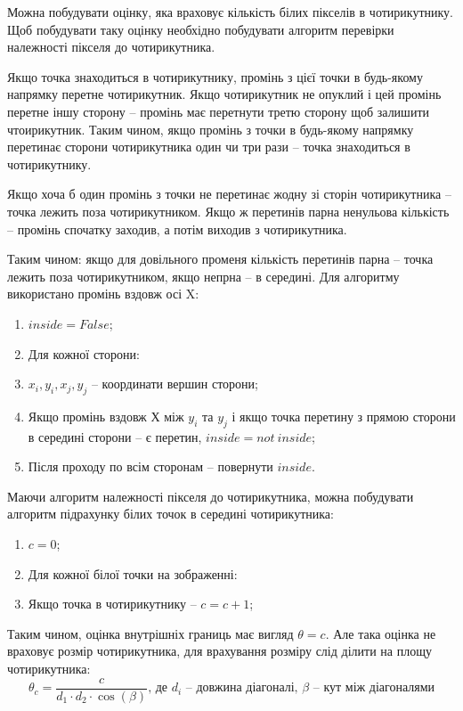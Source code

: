 \documentclass[a4paper,14pt]{report}
\begin{document}
Можна побудувати оцінку, яка враховує кількість білих пікселів в чотирикутнику. Щоб побудувати таку оцінку необхідно побудувати алгоритм перевірки належності пікселя до чотирикутника.

Якщо точка знаходиться в чотирикутнику, промінь з цієї точки в будь-якому напрямку перетне чотирикутник. Якщо чотирикутник не опуклий і цей промінь перетне іншу сторону -- промінь має перетнути третю сторону щоб залишити чтоирикутник.
Таким чином, якщо промінь з точки в будь-якому напрямку перетинає сторони чотирикутника один чи три рази -- точка знаходиться в чотирикутнику.

Якщо хоча б один промінь з точки не перетинає жодну зі сторін чотирикутника -- точка лежить поза чотирикутником. Якщо ж перетинів парна ненульова кількість -- промінь спочатку заходив, а потім виходив з чотирикутника.

Таким чином: якщо для довільного променя кількість перетинів парна -- точка лежить поза чотирикутником, якщо непрна -- в середині. Для алгоритму використано промінь вздовж осі X:
\begin{enumerate}
  \item $inside = False$;
  \item Для кожної сторони:
  \item $x_i, y_i, x_j, y_j$ -- координати вершин сторони;
  \item Якщо промінь вздовж Х між $y_i$ та $y_j$ і якщо точка перетину з прямою сторони в середині сторони -- є перетин, $inside = not\ inside$;
  \item Після проходу по всім сторонам -- повернути $inside$.
\end{enumerate}

Маючи алгоритм належності пікселя до чотирикутника, можна побудувати алгоритм підрахунку білих точок в середині чотирикутника:
\begin{enumerate}
  \item $c = 0$;
  \item Для кожної білої точки на зображенні:
  \item Якщо точка в чотирикутнику -- $c = c+1$;
\end{enumerate}

Таким чином, оцінка внутрішніх границь має вигляд $\theta = c$. 
Але така оцінка не враховує розмір чотирикутника, для врахування розміру слід ділити на площу чотирикутника:
\[
\theta_c = \frac{c}{d_1 \cdot d_2 \cdot \cos(\beta)}\text{, де $d_i$ -- довжина діагоналі, $\beta$ -- кут між діагоналями}
\]
\end{document}
